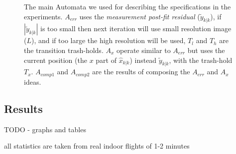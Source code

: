 \documentclass{sig-alternate-ipsn13}
\begin{document}
\begin{figure}[htbp]
\begin{tabular}{c c}
        
    \end{tabular}
    
    \caption{The main Automata we used for describing the specifications in the experiments. 
        \newline $A_{err}$ uses the \textit{measurement post-fit residual} ($\tilde{y}_{k|k}$), if $|\tilde{y}_{k|k}|$ is too small then next iteration will use small resolution image ($L$), and if too large the high resolution will be used, $T_l$ and $T_h$ are the transition trash-holds.
        \newline $A_x$ operate similar to $A_{err}$ but uses the current position (the $x$ part of $\hat{x}_{k|k}$) instead $\tilde{y}_{k|k}$, with the trash-hold $T_x$.
        \newline $A_{comp1}$ and $A_{comp2}$ are the results of composing the $A_{err}$ and $A_x$ ideas.}
    
    \label{fig:test_automata}
\end{figure}

\subsection{Results}
\label{sec:results}
TODO - graphs and tables

all statistics are taken from real indoor flights of 1-2 minutes
\end{document}
